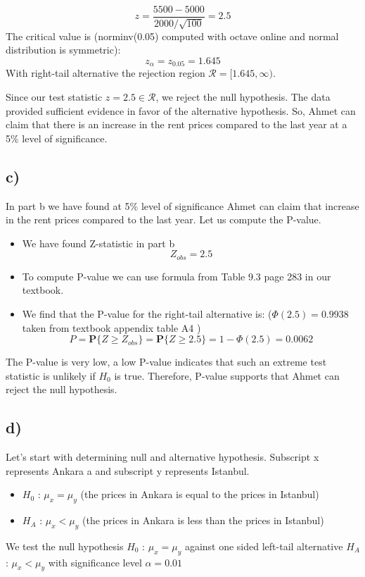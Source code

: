 \documentclass[12pt]{article}
\begin{document}
$$z = \dfrac{5500-5000}{2000/\sqrt{100}} = 2.5$$
The critical value is (\texttt{}{norminv(0.05)} computed with octave online and normal distribution is symmetric): 
$$z_\alpha  = z_{0.05} = 1.645$$
With right-tail alternative the rejection region $\mathcal{R} = [1.645, \infty)$. 


Since our test statistic $z =2.5 \in \mathcal{R}$, we reject the null hypothesis. The data provided sufficient evidence in favor of the alternative hypothesis. So, Ahmet can claim that there is an increase in the rent prices compared to the last year at a 5\% level of significance.

\subsection*{c)}
In part b we have found at 5\% level of significance Ahmet can claim that increase in the rent prices compared to the last year. Let us compute the P-value. 
\begin{itemize}
    \item We have found Z-statistic in part b $$Z_{obs}= 2.5$$
    \item To compute P-value we can use formula from Table 9.3 page 283 in our textbook.
    \item We find that the P-value for the right-tail alternative is: ($\Phi(2.5) = 0.9938$ taken from textbook appendix table A4 )
    $$P = \mathbf{P}\{Z \geq Z_{obs}\} = \mathbf{P}\{Z \geq 2.5\}= 1 - \Phi(2.5) = 0.0062$$
\end{itemize}

The P-value is very low, a low P-value indicates that such an extreme test statistic is unlikely if $H_0$ is true. Therefore, P-value supports that Ahmet can reject the null hypothesis.

\subsection*{d)}
Let's start with determining null and alternative hypothesis. Subscript x represents Ankara a and subscript y represents Istanbul.
\begin{itemize}
    \item $H_0$ : $\mu_x = \mu_y$ (the prices in Ankara is equal to  the prices in Istanbul)
    \item $H_A$ : $\mu_x < \mu_y$ (the prices in Ankara is less than  the prices in Istanbul)
\end{itemize}

We test the null hypothesis $H_0$ : $\mu_x = \mu_y$ against one sided left-tail alternative $H_A$ : $\mu_x < \mu_y$ with significance level $\alpha = 0.01$
\end{document}
